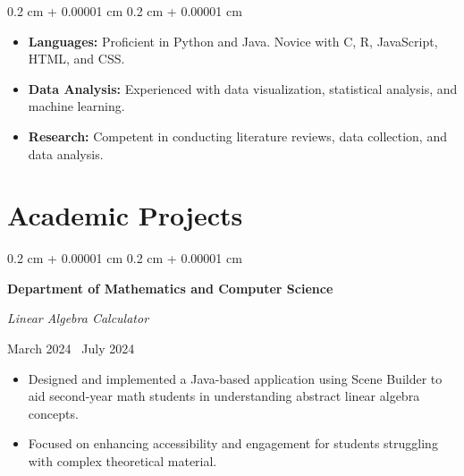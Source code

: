 \documentclass[10pt, letterpaper]{article}
\newenvironment{highlights}{
    \begin{itemize}[
        topsep=0.10 cm,
        parsep=0.10 cm,
        partopsep=0pt,
        itemsep=0pt,
        leftmargin=0.4 cm + 10pt
    ]
}{
    \end{itemize}
} %
\newenvironment{onecolentry}{
    \begin{adjustwidth}{
        0.2 cm + 0.00001 cm
    }{
        0.2 cm + 0.00001 cm
    }
}{
    \end{adjustwidth}
} %
\newenvironment{twocolentry}[2][]{
    \onecolentry
    \def\secondColumn{#2}
    \setcolumnwidth{\fill, 4.5 cm}
    \begin{paracol}{2}
}{
    \switchcolumn \raggedleft \secondColumn
    \end{paracol}
    \endonecolentry
} %
\let\hrefWithoutArrow\href
\renewcommand{\href}[2]{\hrefWithoutArrow{#1}{\ifthenelse{\equal{#2}{}}{ }{#2 }\raisebox{.15ex}{\footnotesize \faExternalLink*}}}
\begin{document}
\begin{onecolentry}
    \begin{highlights}
        \item \textbf{Languages:} Proficient in Python and Java. Novice with C, R, JavaScript, HTML, and CSS.
        \item \textbf{Data Analysis:} Experienced with data visualization, statistical analysis, and machine learning.
        \item \textbf{Research:} Competent in conducting literature reviews, data collection, and data analysis.
    \end{highlights}
\end{onecolentry}
\section{Academic Projects}

\begin{twocolentry}
    {
        March 2024 \textendash\ July 2024 
    }
    \textbf{Department of Mathematics and Computer Science}

    \textit{Linear Algebra Calculator}

\end{twocolentry}

\vspace{0.1cm}
\begin{highlights}
    \item Designed and implemented a Java-based application using Scene Builder to aid second-year math students in understanding abstract linear algebra concepts.
    \item Focused on enhancing accessibility and engagement for students struggling with complex theoretical material.
\end{highlights}









\end{document}
